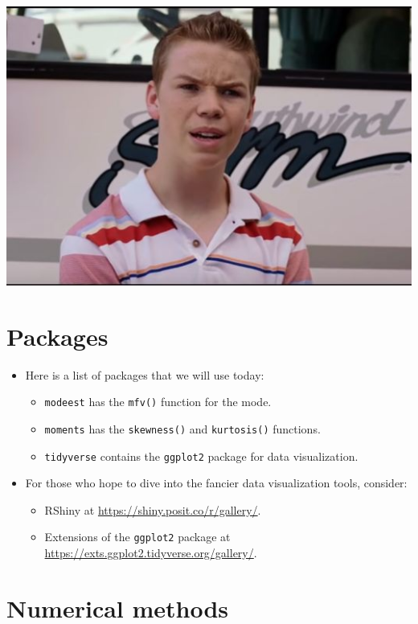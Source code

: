 \documentclass[
]{book}
\providecommand{\tightlist}{%
  \setlength{\itemsep}{0pt}\setlength{\parskip}{0pt}}
\begin{document}
\includegraphics{./img/wait_results.jpg}

\section{Packages}\label{packages-1}

\begin{itemize}
\tightlist
\item
  Here is a list of packages that we will use today:

  \begin{itemize}
  \tightlist
  \item
    \texttt{modeest} has the \texttt{mfv()} function for the mode.
  \item
    \texttt{moments} has the \texttt{skewness()} and \texttt{kurtosis()} functions.
  \item
    \texttt{tidyverse} contains the \texttt{ggplot2} package for data visualization.
  \end{itemize}
\item
  For those who hope to dive into the fancier data visualization tools, consider:

  \begin{itemize}
  \tightlist
  \item
    RShiny at \url{https://shiny.posit.co/r/gallery/}.
  \item
    Extensions of the \texttt{ggplot2} package at \url{https://exts.ggplot2.tidyverse.org/gallery/}.
  \end{itemize}
\end{itemize}

\section{Numerical methods}\label{numerical-methods}
\end{document}
